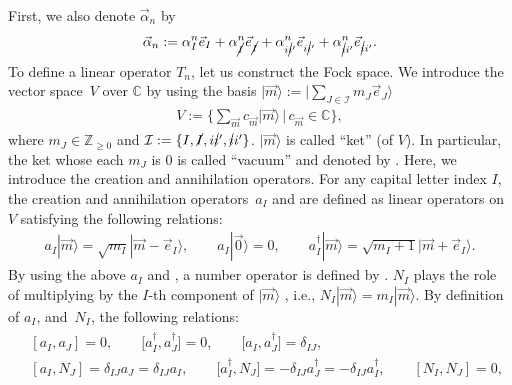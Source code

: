 \documentclass[pdftex]{sigma}
\numberwithin{equation}{section}
\begin{document}
First, we also denote $\vec{\alpha}_{n}$ by
\begin{align*}
\vec{\alpha}_{n}
:=
\alpha_{I}^{n}
\vec{e}_{I}
+
\alpha_{\cancel{I}}^{n}
\vec{e}_{\cancel{I}}
+
\alpha_{i\cancel{i}'}^{n}
\vec{e}_{i\cancel{i}'}
+
\alpha_{\cancel{i}i'}^{n}
\vec{e}_{\cancel{i}i'}
.
\end{align*}
To define a linear operator $T_{n}$, let us construct the Fock space. We introduce the vector space~$V$ over $\mathbb{C}$ by using the basis
$
\big|
\vec{m}
\big\rangle
:=
\bigl|
\sum_{
J
\in
\mathcal{I}
}
m_{J}
\vec{e}_{J}
\big\rangle
$
\begin{align*}
V
:=
\bigg\{
\sum_{
\vec{m}
}
c_{
\vec{m}
}
|
\vec{m}
\rangle
\,\bigg|\,
c_{
\vec{m}
}
\in
\mathbb{C}
\bigg\},
\end{align*}
where
$
m_{J}
\in
\mathbb{Z}_{\geq0}
$
and
$
\mathcal{I}
:=
\{
I,
\cancel{I},
i\cancel{i}',
\cancel{i}i'
\}
$.
$
|
\vec{m}
\rangle
$
is called ``ket'' (of $V$). In particular, the ket whose each $m_{J}$ is 0 is called ``vacuum'' and denoted by
.
Here, we introduce the creation and annihilation operators. For any capital letter index $I$, the creation and annihilation operators~$a_{I}$ and  are defined as
linear operators on $V$ satisfying the following relations:
\begin{align*}
 a_{I}
 |
 \vec{m}
 \rangle
 =
 \sqrt{m_{I}}
|
 \vec{m}
 -
 \vec{e}_{I}
\rangle,
 \qquad
 a_{I}
 |\vec{0}\rangle
 =
 0,
 \qquad
 a_{I}^{\dagger}
|
 \vec{m}
\rangle
 =
 \sqrt{m_{I}+1}
|
 \vec{m}
 +
 \vec{e}_{I}
\rangle
 .
\end{align*}
By using the above $a_{I}$ and , a number operator is defined by
.
$N_{I}$ plays the role of multiplying
by the $I$-th component
of
$
|
 \vec{m}
\rangle
$
,
i.e.,
$
 N_{I}
|
 \vec{m}
\rangle
 =
 m_{I}
|
 \vec{m}
\rangle$.
By definition of $a_{I}$,  and~$N_{I}$, the following relations:
\begin{gather*}
\begin{split}
& [
 a_{I},
 a_{J}
 ]
 =
 0,
\qquad
 \big[
 a_{I}^{\dagger},
 a_{J}^{\dagger}
 \big]
 =
 0,
\qquad
 \big[
 a_{I},
 a_{J}^{\dagger}
 \big]
 =
 \delta_{IJ},
 \\
& [
 a_{I},
 N_{J}
 ]
 =
 \delta_{IJ}a_{J}
 =
 \delta_{IJ}a_{I}
 ,
\qquad
 \big[
 a_{I}^{\dagger},
 N_{J}
 \big]
 =
 -\delta_{IJ}a_{J}^{\dagger}
 =
 -\delta_{IJ}a_{I}^{\dagger}
 ,
\qquad
 [
 N_{I},
 N_{J}
 ]
 =
 0,
\end{split}
\end{gather*}
\end{document}

